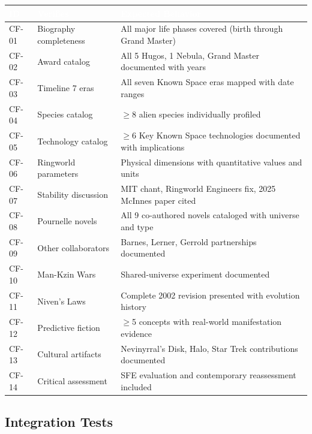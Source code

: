\documentclass[11pt,letterpaper]{article}
\newcommand{\tableheader}[1]{\textbf{\sffamily\textcolor{white}{#1}}}
\begin{document}
\begin{center}
\begin{tabularx}{\textwidth}{C{1.2cm}L{3.5cm}X}
\toprule
{}
\tableheader{ID} & \tableheader{Verifies} & \tableheader{Expected Behavior} \\
\midrule
CF-01 & Biography completeness & All major life phases covered (birth through Grand Master) \\
CF-02 & Award catalog & All 5 Hugos, 1 Nebula, Grand Master documented with years \\
CF-03 & Timeline 7 eras & All seven Known Space eras mapped with date ranges \\
CF-04 & Species catalog & $\geq$8 alien species individually profiled \\
CF-05 & Technology catalog & $\geq$6 Key Known Space technologies documented with implications \\
CF-06 & Ringworld parameters & Physical dimensions with quantitative values and units \\
CF-07 & Stability discussion & MIT chant, Ringworld Engineers fix, 2025 McInnes paper cited \\
CF-08 & Pournelle novels & All 9 co-authored novels cataloged with universe and type \\
CF-09 & Other collaborators & Barnes, Lerner, Gerrold partnerships documented \\
CF-10 & Man-Kzin Wars & Shared-universe experiment documented \\
CF-11 & Niven's Laws & Complete 2002 revision presented with evolution history \\
CF-12 & Predictive fiction & $\geq$5 concepts with real-world manifestation evidence \\
CF-13 & Cultural artifacts & Nevinyrral's Disk, Halo, Star Trek contributions documented \\
CF-14 & Critical assessment & SFE evaluation and contemporary reassessment included \\
\bottomrule
\end{tabularx}
\end{center}

\subsection{Integration Tests}
\end{document}
